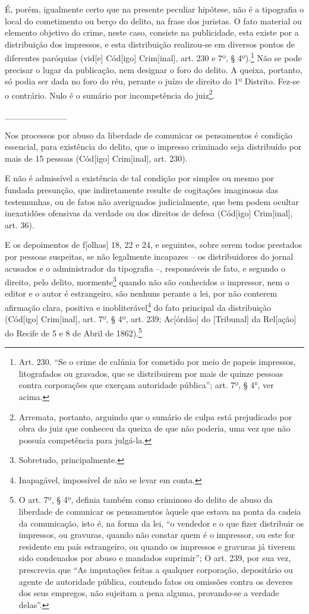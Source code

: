 É, porém, igualmente certo que na presente peculiar hipótese, não é a
tipografia o local do cometimento ou berço do delito, na frase dos
juristas. O fato material ou elemento objetivo do crime, neste caso,
consiste na publicidade, esta existe por a distribuição dos impressos, e
esta distribuição realizou-se em diversos pontos de diferentes paróquias
(vid{[}e{]} Cód{[}igo{]} Crim{[}inal{]}, art. 230 e 7º, § 4º).\footnote{Art.
  230. ``Se o crime de calúnia for cometido por meio de papeis
  impressos, litografados ou gravados, que se distribuirem por mais de
  quinze pessoas contra corporações que exerçam autoridade pública'';
  art. 7º, § 4°, ver acima.} Não se pode precisar o lugar da publicação,
nem designar o foro do delito. A queixa, portanto, só podia ser dada no
foro do réu, perante o juízo de direito do 1º Distrito. Fez-se o
contrário. Nulo é o sumário por incompetência do juiz\footnote{Arremata,
  portanto, arguindo que o sumário de culpa está prejudicado por obra do
  juiz que conheceu da queixa de que não poderia, uma vez que não
  possuía competência para julgá-la.}.

\_\_\_\_\_\_\_\_\_\_

Nos processos por abuso da liberdade de comunicar os pensamentos é
condição essencial, para existência do delito, que o impresso criminado
seja distribuído por mais de 15 pessoas (Cód{[}igo{]} Crim{[}inal{]},
art. 230).

E não é admissível a existência de tal condição por simples ou mesmo por
fundada presunção, que indiretamente resulte de cogitações imaginosas
das testemunhas, ou de fatos não averiguados judicialmente, que bem
podem ocultar inexatidões ofensivas da verdade ou dos direitos de defesa
(Cód{[}igo{]} Crim{[}inal{]}, art. 36).

E os depoimentos de f{[}olhas{]} 18, 22 e 24, e seguintes, sobre serem
todos prestados por pessoas suspeitas, se não legalmente incapazes -- os
distribuidores do jornal acusados e o administrador da tipografia --,
responsáveis de fato, e segundo o direito, pelo delito,
mormente\footnote{Sobretudo, principalmente.} quando não são conhecidos
o impressor, nem o editor e o autor é estrangeiro, são nenhuns perante a
lei, por não conterem afirmação clara, positiva e
inobliterável\footnote{Inapagável, impossível de não se levar em conta.}
do fato principal da distribuição (Cód{[}igo{]} Crim{[}inal{]}, art. 7º,
§ 4º, art. 239; Ac{[}órdão{]} do {[}Tribunal{]} da Rel{[}ação{]} do
Recife de 5 e 8 de Abril de 1862).\footnote{O art. 7º, § 4º, definia
  também como criminoso do delito de abuso da liberdade de comunicar os
  pensamentos àquele que estava na ponta da cadeia da comunicação, isto
  é, na forma da lei, ``o vendedor e o que fizer distribuir os
  impressos, ou gravuras, quando não constar quem é o impressor, ou este
  for residente em país estrangeiro, ou quando os impressos e gravuras
  já tiverem sido condenados por abuso e mandados suprimir''; O art.
  239, por sua vez, prescrevia que ``As imputações feitas a qualquer
  corporação, depositário ou agente de autoridade pública, contendo
  fatos ou omissões contra os deveres dos seus empregos, não sujeitam a
  pena alguma, provando-se a verdade delas''.}

